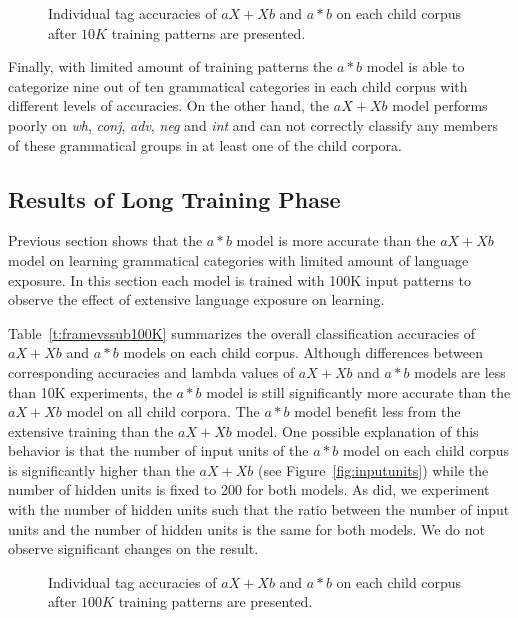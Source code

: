 \begin{figure}[h]
 \caption{Individual tag accuracies of $aX+Xb$ and $a*b$ on each child corpus
 after $10K$ training patterns are presented.}
  \label{fig:category10K}
\end{figure}

Finally, with limited amount of training patterns the $a*b$ model is able to
categorize nine out of ten grammatical categories in each child corpus with
different levels of accuracies.  On the other hand, the $aX+Xb$ model performs
poorly on {\it wh}, {\it conj}, {\it adv}, {\it neg} and {\it int} and can not
correctly classify any members of these grammatical groups in at least one of
the child corpora.

\subsection{Results of Long Training Phase} 

Previous section shows that the $a*b$ model is more accurate than the $aX+Xb$
model on learning grammatical categories with limited amount of language
exposure.  In this section each model is trained with 100K input patterns to
observe the effect of extensive language exposure on learning.


Table~\ref{t:framevssub100K} summarizes the overall classification accuracies
of $aX+Xb$ and $a*b$ models on each child corpus.  Although differences between
corresponding accuracies and lambda values of $aX+Xb$ and $a*b$ models are less
than 10K experiments, the $a*b$ model is still significantly more accurate than
the $aX+Xb$ model on all child corpora.  The $a*b$ model benefit less from the
extensive training than the $aX+Xb$ model. One possible explanation of this
behavior is that the number of input units of the $a*b$ model on each child
corpus is significantly higher than the $aX+Xb$ (see
Figure~\ref{fig:inputunits}) while the number of hidden units is fixed to 200
for both models. As \citep*{clair2010} did, we experiment with the number of
hidden units such that the ratio between the number of input units and
the number of hidden units is the
same for both models. We do not observe significant changes on the result.

\begin{figure}[h]
  \caption{Individual tag accuracies of $aX+Xb$ and $a*b$ on each child corpus
  after $100K$ training patterns are presented.}  
  \label{fig:category100K}
\end{figure}

